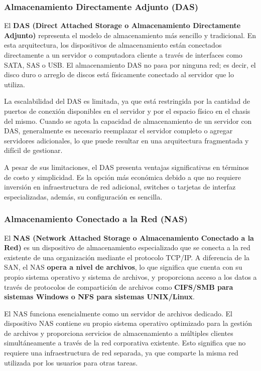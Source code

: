 \subsubsection{Almacenamiento Directamente Adjunto (DAS)}

El \textbf{DAS (Direct Attached Storage o Almacenamiento Directamente Adjunto)} representa el modelo de almacenamiento más sencillo y tradicional. En esta arquitectura, los dispositivos de almacenamiento están conectados directamente a un servidor o computadora cliente a través de interfaces como SATA, SAS o USB. El almacenamiento DAS no pasa por ninguna red; es decir, el disco duro o arreglo de discos está físicamente conectado al servidor que lo utiliza.

La escalabilidad del DAS es limitada, ya que está restringida por la cantidad de puertos de conexión disponibles en el servidor y por el espacio físico en el chasis del mismo. Cuando se agota la capacidad de almacenamiento de un servidor con DAS, generalmente es necesario reemplazar el servidor completo o agregar servidores adicionales, lo que puede resultar en una arquitectura fragmentada y difícil de gestionar.

A pesar de sus limitaciones, el DAS presenta ventajas significativas en términos de costo y simplicidad. Es la opción más económica debido a que no requiere inversión en infraestructura de red adicional, switches o tarjetas de interfaz especializadas, además, su configuración es sencilla.

\subsubsection{Almacenamiento Conectado a la Red (NAS)}

El \textbf{NAS (Network Attached Storage o Almacenamiento Conectado a la Red)} es un dispositivo de almacenamiento especializado que se conecta a la red existente de una organización mediante el protocolo TCP/IP. A diferencia de la SAN, el NAS \textbf{opera a nivel de archivos}, lo que significa que cuenta con su propio sistema operativo y sistema de archivos, y proporciona acceso a los datos a través de protocolos de compartición de archivos como \textbf{CIFS/SMB para sistemas Windows o NFS para sistemas UNIX/Linux}.

El NAS funciona esencialmente como un servidor de archivos dedicado. El dispositivo NAS contiene su propio sistema operativo optimizado para la gestión de archivos y proporciona servicios de almacenamiento a múltiples clientes simultáneamente a través de la red corporativa existente. Esto significa que no requiere una infraestructura de red separada, ya que comparte la misma red utilizada por los usuarios para otras tareas.

